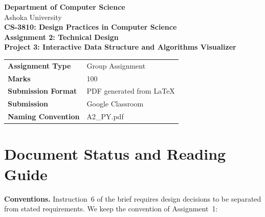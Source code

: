\documentclass[11pt,a4paper]{article}
\renewcommand{\arraystretch}{1.12}
\begin{document}
\begin{center}
  {\large\bfseries Department of Computer Science}\\[2pt]
  {\small Ashoka University}\\[10pt]
  {\LARGE\bfseries CS-3810: Design Practices in Computer Science}\\[6pt]
  {\large\bfseries Assignment 2: Technical Design}\\[10pt]
  {\large\bfseries Project 3: Interactive Data Structure and Algorithms Visualizer}
\end{center}

\vspace{2pt}
\begin{center}
\renewcommand{\arraystretch}{1.25}
\begin{tabular}{@{}L{4.2cm}L{10.4cm}@{}}
\toprule
\textbf{Assignment Type} & Group Assignment \\
\textbf{Marks} & 100 \\
\textbf{Submission Format} & PDF generated from \LaTeX \\
\textbf{Submission} & Google Classroom \\
\textbf{Naming Convention} & A2\_PY.pdf \\
\bottomrule
\end{tabular}
\end{center}

\section*{Document Status and Reading Guide}

\noindent{}

\medskip
\textbf{Conventions.} Instruction~6 of the brief requires design decisions to be separated
from stated requirements. We keep the convention of Assignment~1:
\end{document}
